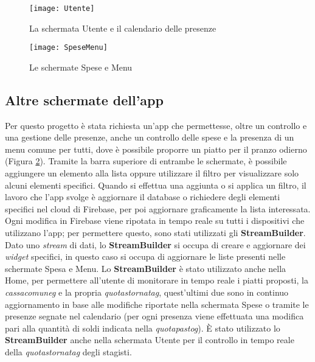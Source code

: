 \newpage

\begin{figure}[!h] 
    \centering 
    \texttt{[image: Utente]} 
    \caption{La schermata Utente e il calendario delle presenze}
    \label{fig:utente-presenze}
\end{figure}
\begin{figure}[!h] 
    \centering 
    \texttt{[image: SpeseMenu]} 
    \caption{Le schermate Spese e Menu}
    \label{fig:spese-menu}
\end{figure}
\newpage

\subsection{Altre schermate dell'app}
Per questo progetto è stata richiesta un'app che permettesse, oltre un controllo e una gestione delle presenze, anche un controllo delle spese e la presenza di un menu comune per tutti, dove è possibile proporre un piatto per il pranzo odierno (Figura \ref{fig:spese-menu}).\newline
Tramite la barra superiore di entrambe le schermate, è possibile aggiungere un elemento alla lista oppure utilizzare il filtro per visualizzare solo alcuni elementi specifici.\newline
\newline
Quando si effettua una aggiunta o si applica un filtro, il lavoro che l'app svolge è aggiornare il database o richiedere degli elementi specifici nel cloud di Firebase, per poi aggiornare graficamente la lista interessata.\newline
Ogni modifica in Firebase viene ripotata in tempo reale su tutti i dispositivi che utilizzano l'app; per permettere questo, sono stati utilizzati gli \textbf{StreamBuilder}.\newline
Dato uno \emph{stream} di dati, lo \textbf{StreamBuilder} si occupa di creare e aggiornare dei \emph{widget} specifici, in questo caso si occupa di aggiornare le liste presenti nelle schermate Spesa e Menu.\newline
\newline
Lo \textbf{StreamBuilder} è stato utilizzato anche nella Home, per permettere all'utente di monitorare in tempo reale i piatti proposti, la \emph{\gls{cassacomuneg}} e la propria \emph{\gls{quotastornatag}}, quest'ultimi due sono in continuo aggiornamento in base alle modifiche riportate nella schermata Spese o tramite le presenze segnate nel calendario (per ogni presenza viene effettuata una modifica pari alla quantità di soldi indicata nella \emph{\gls{quotapastog}}).\newline
È stato utilizzato lo \textbf{StreamBuilder} anche nella schermata Utente per il controllo in tempo reale della \emph{\gls{quotastornatag}} degli stagisti.

